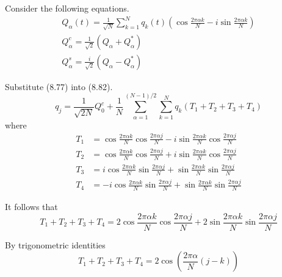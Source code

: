 


Consider the following equations.
\begin{gather*}
Q_\alpha(t)=\frac{1}{\sqrt N}\sum_{k=1}^Nq_k(t)
\left(
\cos\frac{2\pi\alpha k}{N}-i\sin\frac{2\pi\alpha k}{N}
\right)
\tag{8.77}
\\
Q_\alpha^c=\frac{1}{\sqrt2}(Q_\alpha+Q_\alpha^*)
\tag{8.79}
\\
Q_\alpha^s=\frac{i}{\sqrt2}(Q_\alpha-Q_\alpha^*)
\tag{8.80}
\end{gather*}

Substitute (8.77) into (8.82).
\begin{equation*}
q_j=
\frac{1}{\sqrt{2N}}Q_0^c
+
\frac{1}{N}
\sum_{\alpha=1}^{(N-1)/2}
\sum_{k=1}^N
q_k(T_1+T_2+T_3+T_4)
\tag{1}
\end{equation*}
where
\begin{align*}
T_1&=\cos\frac{2\pi\alpha k}{N}\cos\frac{2\pi\alpha j}{N}
-i\sin\frac{2\pi\alpha k}{N}\cos\frac{2\pi\alpha j}{N}
\\
T_2&=\cos\frac{2\pi\alpha k}{N}\cos\frac{2\pi\alpha j}{N}
+i\sin\frac{2\pi\alpha k}{N}\cos\frac{2\pi\alpha j}{N}
\\
T_3&=i\cos\frac{2\pi\alpha k}{N}\sin\frac{2\pi\alpha j}{N}
+\sin\frac{2\pi\alpha k}{N}\sin\frac{2\pi\alpha j}{N}
\\
T_4&=-i\cos\frac{2\pi\alpha k}{N}\sin\frac{2\pi\alpha j}{N}
+\sin\frac{2\pi\alpha k}{N}\sin\frac{2\pi\alpha j}{N}
\end{align*}

It follows that
\begin{equation*}
T_1+T_2+T_3+T_4=
2\cos\frac{2\pi\alpha k}{N}\cos\frac{2\pi\alpha j}{N}
+2\sin\frac{2\pi\alpha k}{N}\sin\frac{2\pi\alpha j}{N}
\end{equation*}

By trigonometric identities
\begin{equation*}
T_1+T_2+T_3+T_4=2\cos\left(\frac{2\pi\alpha}{N}(j-k)\right)
\tag{2}
\end{equation*}


